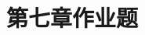 \documentclass{article}
\begin{document}
\title{第七章作业题}
\begin{CJK}{UTF8}{gbsn}
  \newtheorem{Exercise}{习题}
  \date{}
  \maketitle

  
%  
  
%  
  
%  
  
%  
  
%  
  
%  
  
%  
  
%  
  
%  

\end{CJK}
\end{document}
